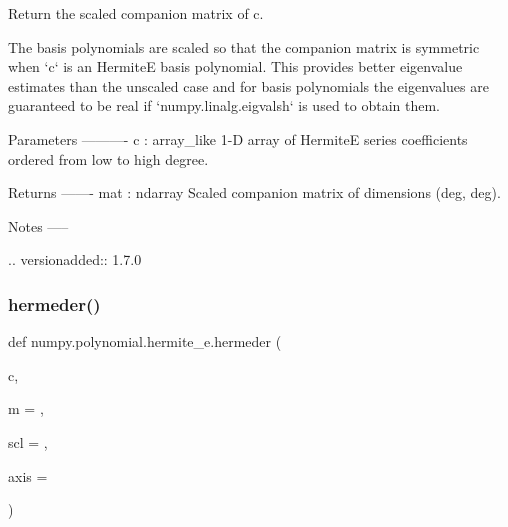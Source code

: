 \begin{DoxyVerb}Return the scaled companion matrix of c.

The basis polynomials are scaled so that the companion matrix is
symmetric when `c` is an HermiteE basis polynomial. This provides
better eigenvalue estimates than the unscaled case and for basis
polynomials the eigenvalues are guaranteed to be real if
`numpy.linalg.eigvalsh` is used to obtain them.

Parameters
----------
c : array_like
    1-D array of HermiteE series coefficients ordered from low to high
    degree.

Returns
-------
mat : ndarray
    Scaled companion matrix of dimensions (deg, deg).

Notes
-----

.. versionadded:: 1.7.0\end{DoxyVerb}
 \mbox{\label{namespacenumpy_1_1polynomial_1_1hermite__e_a5146abcb0e10bb656e4595c83d2e9806}} 
\subsubsection{\texorpdfstring{hermeder()}{hermeder()}}
{\footnotesize\ttfamily def numpy.\+polynomial.\+hermite\+\_\+e.\+hermeder (\begin{DoxyParamCaption}\item[{}]{c,  }\item[{}]{m = {},  }\item[{}]{scl = {},  }\item[{}]{axis = {} }\end{DoxyParamCaption})}

